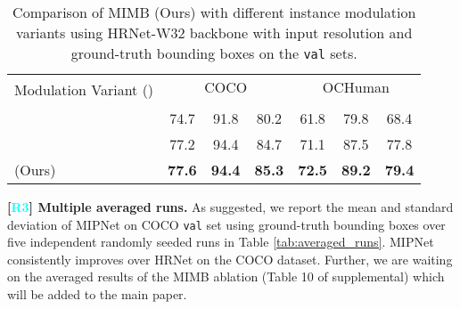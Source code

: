 \documentclass[10pt,twocolumn,letterpaper]{article}
\newcommand{\Rthree}{\textcolor{cyan}{R3}}
\begin{document}
\begin{table}
\centering
\captionsetup{font=small}
\setlength{\tabcolsep}{1.9pt}
    \small
    \renewcommand{\arraystretch}{1.0} \begin{tabular}{@{}l|c c c|c c c@{}}
    \hline
   \multirow{2}{*}{Modulation Variant ()} & \multicolumn{3}{c|}{COCO} & \multicolumn{3}{c}{OCHuman}\\
    &  &  &  &  &  &    \\
    \hline
      & 74.7 & 91.8 & 80.2 & 61.8 & 79.8 & 68.4 \\
     & 77.2 & 94.4 & 84.7 & 71.1 & 87.5 & 77.8 \\
      (Ours) & \textbf{77.6} & \textbf{94.4} & \textbf{85.3} & \textbf{72.5} & \textbf{89.2} & \textbf{79.4} \\
    \hline
    \end{tabular}

    \vspace*{-0.1in}
    \caption{Comparison of MIMB (Ours) with different instance modulation variants using HRNet-W32 backbone with  input resolution and ground-truth bounding boxes on the \texttt{val} sets.}
    \label{tab:modulation}
    \vspace*{-0.25in}
\end{table} 
\vspace{1.5mm}\noindent
\textbf{[\Rthree] Multiple averaged runs.} As suggested, we report the mean and standard deviation of MIPNet on COCO \texttt{val} set using ground-truth bounding boxes over five independent randomly seeded runs in Table \ref{tab:averaged_runs}. MIPNet consistently improves over HRNet on the COCO dataset. Further, we are waiting on the averaged results of the MIMB ablation (Table 10 of supplemental) which will be added to the main paper.
\end{document}
